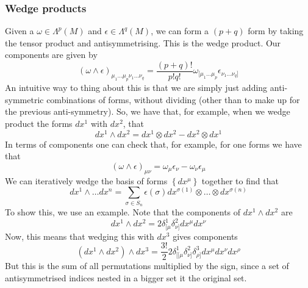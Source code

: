 \documentclass[11pt, a4paper]{article}   	%
\theoremstyle{slplain}
\begin{document}
\subsubsection{Wedge products} 
Given a $ \omega  \in \Lambda^ p ( M ) $ and $ \epsilon \in \Lambda^ q ( M ) $, we can form a  $ ( p + q ) $ form 
by taking the tensor product and antisymmetrising. 
This is the wedge product. 
Our components are given by 
\[
( \omega \wedge  \epsilon )_{ \mu_1 \dots \mu_{ p } \nu_1 \dots \nu_{ q }} = \frac{ ( p + q ) ! }{p ! q ! } \omega _{ [ \mu_1 \dots \mu_p } \epsilon_{ \nu_1 \dots \nu_q ] }
\] An intuitive way to thing about this is that 
we are simply just adding anti-symmetric combinations of 
forms, without dividing (other than to make up for the previous 
anti-symmetry). So, we have that, for example, when 
we wedge product the forms $ dx ^ 1  $ with $dx^ 2 $, that 
\[
dx^ 1 \wedge  dx^ 2 = dx^ 1 \otimes dx^ 2 - dx^ 2 \otimes dx^ 1 
\] In terms of components one can check that, for example, for one forms we have that 
\[
( \omega \wedge  \epsilon )_{ \mu \nu } = \omega_{ \mu } \epsilon_{ \nu } - \omega_{ \nu } \epsilon_{ \mu }
\] We can iteratively wedge the basis of forms $\left\{  dx^ \mu  \right\}  $
together to find that 
\[
dx ^ 1 \wedge  \dots dx^ n = \sum_{ \sigma \in S_n } \epsilon ( \sigma)  dx^{ \sigma ( 1) } \otimes \dots \otimes dx^{ \sigma( n ) }
\] To show this, we use an example. Note that the 
components of $ dx^ 1 \wedge  dx^ 2 $ are 
\[
dx^ 1 \wedge  dx^ 2 = 2 \delta^ 1 _{ [ \mu } \delta^ 2 _{ \nu ] } dx^ \mu dx^ \nu 
\]  Now, this means that wedging this with $ dx^ 3 $ gives 
components  \[
( dx^ 1 \wedge  dx^ 2 ) \wedge  dx^ 3 = \frac{3!}{2 } 2 \delta^1_{ [ [ \mu } \delta^ 2_{ \nu ] } \delta^ 3 _{ \rho ] } dx^ \mu dx^ \nu dx^ \rho 
\] But this is the sum of all permutations multiplied 
by the sign, since a set of antisymmetrised indices nested 
in a bigger set it the original set.
\end{document}
